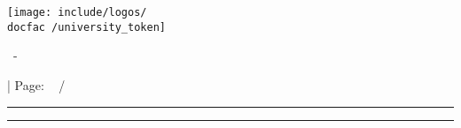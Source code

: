 {
	\hspace*{0.02\textwidth}
	\begin{minipage}[m]{0.3\textwidth}
		\vspace*{3ex}
		\texttt{[image: include/logos/\\docfac /university\_token]}
	\end{minipage}
	\begin{minipage}[m]{0.45\textwidth}
		\vspace*{3ex}
		\doctitle ~- \docsubtitle
	\end{minipage}
	\hfill
	\begin{minipage}[m]{0.14\textwidth}
		\vspace*{3ex}
		| Page: \hfill \insertframenumber ~ / \inserttotalframenumber
		\hspace*{0.1\textwidth}
	\end{minipage}
	\color{\docfac }
	\rule{\paperwidth}{1pt}
}
%
%
%
{
	\color{\docfac }
	\rule{\paperwidth}{1pt}
	\color{black}
	\begin{minipage}[c]{\textwidth}
		\vspace*{1ex}
		\hspace*{0.02\textwidth} \docauthor \hfill \docdate \hspace{0.02\textwidth}
		\vspace*{2ex}
	\end{minipage}
}
